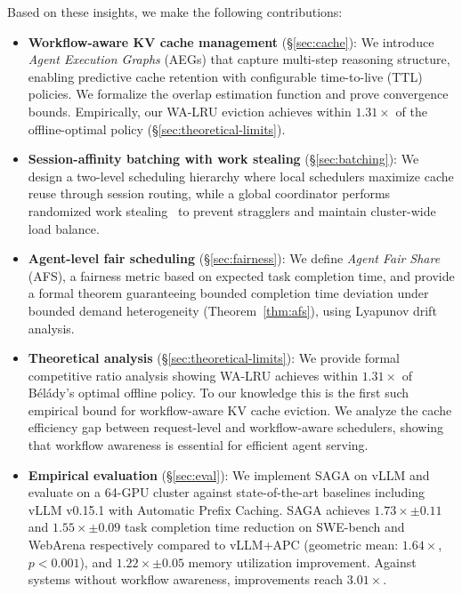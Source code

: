 \documentclass[sigconf]{acmart}
\newcommand{\sysname}{SAGA\xspace}
\begin{document}
Based on these insights, we make the following contributions:

\begin{itemize}[leftmargin=*,noitemsep,topsep=0pt]
    \item \textbf{Workflow-aware KV cache management} (\S\ref{sec:cache}): We introduce \emph{Agent Execution Graphs} (AEGs) that capture multi-step reasoning structure, enabling predictive cache retention with configurable time-to-live (TTL) policies. We formalize the overlap estimation function and prove convergence bounds. Empirically, our WA-LRU eviction achieves within $1.31\times$ of the offline-optimal policy (\S\ref{sec:theoretical-limits}).

    \item \textbf{Session-affinity batching with work stealing} (\S\ref{sec:batching}): We design a two-level scheduling hierarchy where local schedulers maximize cache reuse through session routing, while a global coordinator performs randomized work stealing~\cite{blumofe1999scheduling} to prevent stragglers and maintain cluster-wide load balance.

    \item \textbf{Agent-level fair scheduling} (\S\ref{sec:fairness}): We define \emph{Agent Fair Share} (AFS), a fairness metric based on expected task completion time, and provide a formal theorem guaranteeing bounded completion time deviation under bounded demand heterogeneity (Theorem~\ref{thm:afs}), using Lyapunov drift analysis.

    \item \textbf{Theoretical analysis} (\S\ref{sec:theoretical-limits}): We provide formal competitive ratio analysis showing WA-LRU achieves within $1.31\times$ of B\'{e}l\'{a}dy's optimal offline policy. To our knowledge this is the first such empirical bound for workflow-aware KV cache eviction. We analyze the cache efficiency gap between request-level and workflow-aware schedulers, showing that workflow awareness is essential for efficient agent serving.

    \item \textbf{Empirical evaluation} (\S\ref{sec:eval}): We implement \sysname on vLLM and evaluate on a 64-GPU cluster against state-of-the-art baselines including vLLM v0.15.1 with Automatic Prefix Caching. \sysname achieves $1.73\times \pm 0.11$ and $1.55\times \pm 0.09$ task completion time reduction on SWE-bench and WebArena respectively compared to vLLM+APC (geometric mean: $1.64\times$, $p < 0.001$), and $1.22\times \pm 0.05$ memory utilization improvement. Against systems without workflow awareness, improvements reach $3.01\times$.
\end{itemize}
\end{document}
